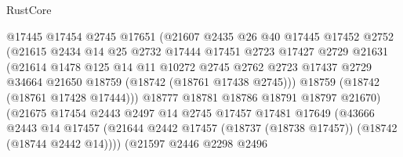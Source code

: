 \begin{lexlean}{RustCore}
\begin{coremodule}
                            @17445
                            @17454
                            @2745
                            @17651
                            (@21607
                              @2435
                              @26
                              @40
                              @17445
                              @17452
                              @2752
                              (@21615
                                @2434
                                @14
                                @25
                                @2732
                                @17444
                                @17451
                                @2723
                                @17427
                                @2729
                                @21631
                                (@21614
                                  @1478
                                  @125
                                  @14
                                  @11
                                  @10272
                                  @2745
                                  @2762
                                  @2723
                                  @17437
                                  @2729
                                  @34664
                                  @21650
                                  @18759
                                  (@18742 (@18761 @17438 @2745)))
                                @18759
                                (@18742 (@18761 @17428 @17444)))
                              @18777
                              @18781
                              @18786
                              @18791
                              @18797
                              @21670)
                            (@21675
                              @17454
                              @2443
                              @2497
                              @14
                              @2745
                              @17457
                              @17481
                              @17649
                              (@43666
                                @2443
                                @14
                                @17457
                                (@21644
                                  @2442
                                  @17457
                                  (@18737 (@18738 @17457))
                                  (@18742 (@18744 @2442 @14))))
                              (@21597
                                @2446
                                @2298
                                @2496

\end{coremodule}
\end{lexlean}
